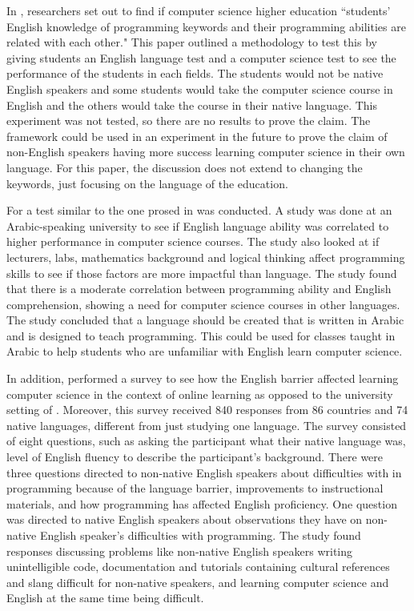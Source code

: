 \documentclass[10pt,twocolumn]{article}
\begin{document}
 In \textcite{Veerasamy2014Teaching}, researchers set out to find if computer science higher education ``students’ English knowledge of programming keywords and their programming abilities are related with each other." This paper outlined a methodology to test this by giving students an English language test and a computer science test to see the performance of the students in each fields. The students would not be native English speakers and some students would take the computer science course in English and the others would take the course in their native language. This experiment was not tested, so there are no results to prove the claim. The framework could be used in an experiment in the future to prove the claim of non-English speakers having more success learning computer science in their own language. For this paper, the discussion does not extend to changing the keywords, just focusing on the language of the education.

For \textcite{Idris2018Correlation} a test similar to the one prosed in \textcite{Veerasamy2014Teaching} was conducted. A study was done at an Arabic-speaking university to see if English language ability was correlated to higher performance in computer science courses. The study also looked at if lecturers, labs, mathematics background and logical thinking affect programming skills to see if those factors are more impactful than language. The study found that there is a moderate correlation between programming ability and English comprehension, showing a need for computer science courses in other languages. The study concluded that a language should be created that is written in Arabic and is designed to teach programming. This could be used for classes taught in Arabic to help students who are unfamiliar with English learn computer science.

In addition, \textcite{Guo2018Non} performed a survey to see how the English barrier affected learning computer science in the context of online learning as opposed to the university setting of \textcite{Idris2018Correlation}. Moreover, this survey received 840 responses from 86 countries and 74 native languages, different from just studying one language. The survey consisted of eight questions, such as asking the participant what their native language was, level of English fluency to describe the participant's background. There were three questions directed to non-native English speakers about difficulties with in programming because of the language barrier, improvements to instructional materials, and how programming has affected English proficiency. One question was directed to native English speakers about observations they have on non-native English speaker's difficulties with programming. The study found responses discussing problems like non-native English speakers writing unintelligible code, documentation and tutorials containing cultural references and slang difficult for non-native speakers, and learning computer science and English at the same time being difficult.
\end{document}
